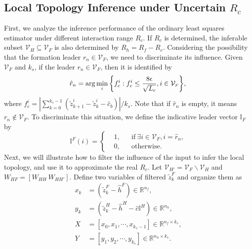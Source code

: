 \documentclass[12pt,journal,draftclsnofoot,onecolumn]{IEEEtran}
\let \sss=\scriptscriptstyle
\begin{document}
\subsection{Local Topology Inference under Uncertain $R_c$} \label{subsec:estimator}
First, we analyze the inference performance of the ordinary least squares estimator under different interaction range $R_c$. 
If $R_c$ is determined, the inferable subset $\mathcal{V}_{\sss H} \!\subseteq\! \mathcal{V}_{\sss F}$ is also determined by $R_h=R_f-R_c$. 
Considering the possibility that the formation leader $r_{n}\in\mathcal{V}_{\sss F}$, we need to discriminate its influence. 
Given  $\mathcal{V}_{\sss F}$ and $k_s$, if the leader $r_{n}\in \mathcal{V}_{\sss F}$, then it is identified by 
\begin{equation}
\hat r_{n}= {\arg \mathop {\min }\limits_{i} \left\{  f_{c}^{i} : f_{c}^{i} \le \frac{8\epsilon}{\sqrt{L_c}} , i\in\mathcal{V}_{\sss F} \right\}},  \label{ww1}\\
\end{equation}
where $f_{c}^{i}={ | \sum\nolimits_{k = 0}^{k_s-1} (\tilde{z}_{k+1}^{i} - \tilde{z}_{k}^{i} - \hat c_b )| } / { {k_s} }$. 
Note that if $\hat r_{n}$ is empty, it means $r_{n}\notin \mathcal{V}_{\sss F}$. 
To discriminate this situation, we define the indicative leader vector $\mathbb{I}_{\sss F}$ by 
\begin{equation}\label{eq:indicator}
\mathbb{I}^{\sss F}(i)=\left\{ {\begin{aligned}
&1, &&\text{if}~\exists i\in \mathcal{V}_{\sss F}, i=\hat r_{n},\\
&0, &&\text{otherwise}. 
\end{aligned}} \right.
\end{equation}
Next, we will illustrate how to filter the influence of the input to infer the local topology, and use it to approximate the real $R_c$. 
Let $\mathcal{V}_{\sss H'}=\mathcal{V}_{\sss F}\backslash{\mathcal{V}_{\sss H}}$ and $W_{\sss HF}=[W_{\sss HH}~W_{\sss HH'}]$. 
Define two variables of filtered $\tilde z_{k}^{\sss F}$ and organize them as 
\begin{equation}\label{eq:filtered_observation}
\begin{aligned}
x_k &= ( \tilde z_{k}^{\sss F} -\hat h^{\sss F})\in \mathbb{R}^{n_f},    \\
y_k &= ( \tilde z_{k}^{\sss H} -\hat h^{\sss H} - \hat c \mathbb{I}^{\sss H}) \in \mathbb{R}^{n_h} ,   \\
X &=[x_0,x_1,\cdots,x_{k_s-1}]\in \mathbb{R}^{n_f \times k_s},   \\
Y &=[y_1,y_2,\cdots,y_{k_s}]\in \mathbb{R}^{n_h \times k_s}.
\end{aligned}
\end{equation}
\end{document}
